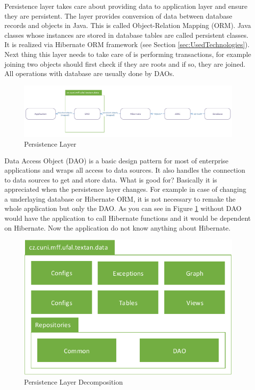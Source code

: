 
Persistence layer takes care about providing data to application layer and
ensure they are persistent. The layer provides conversion of data between database
records and objects in Java. This is called Object-Relation Mapping
(ORM). Java classes whose instances are stored in database tables are called
persistent classes. It is realized via Hibernate ORM framework (see Section
\ref{sec:UsedTechnologies}). Next thing this layer needs to take care of is performing transactions,
for example joining two objects should first check if they are roots and if so, they
are joined. All operations with database are usually done by DAOs.

\begin{figure}[!htb]
        \centering
        \includegraphics[width=\textwidth]{Images/PersistentLayer}
        \caption{Persistence Layer}
        \label{fig:PersistentLayer}
\end{figure}

Data Access Object (DAO) is a basic design pattern for most of enterprise
applications and wraps all access to data sources. It also handles the
connection to data sources to get and store data. What is good for? Basically
it is appreciated when the persistence layer changes. For example in case of changing
a underlaying database or Hibernate ORM, it is not necessary to remake the whole
application but only the DAO. As you can see in Figure
\ref{fig:PersistentLayer} without DAO would have the application
to call Hibernate functions and it would be dependent on Hibernate. Now the
application do not know anything about Hibernate.

\begin{figure}[!htb]
        \centering
        \includegraphics{Images/DataDecomposition}
        \caption{Persistence Layer Decomposition}
        \label{fig:DataDecomposition}
\end{figure}

